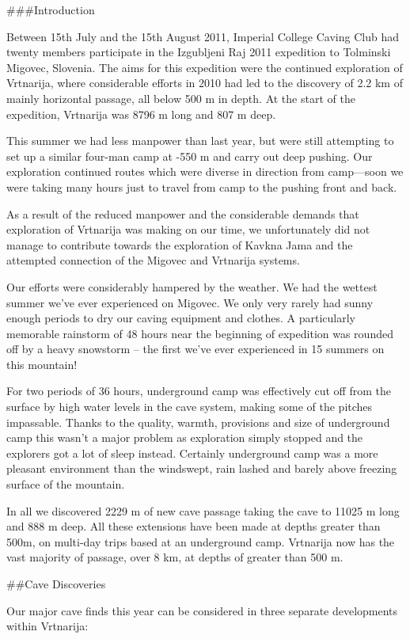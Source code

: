\#\#\#Introduction

Between 15th July and the 15th August 2011, Imperial College Caving Club
had twenty members participate in the Izgubljeni Raj 2011 expedition to
Tolminski Migovec, Slovenia. The aims for this expedition were the
continued exploration of Vrtnarija, where considerable efforts in 2010
had led to the discovery of 2.2 km of mainly horizontal passage, all
below 500 m in depth. At the start of the expedition, Vrtnarija was 8796
m long and 807 m deep.

This summer we had less manpower than last year, but were still
attempting to set up a similar four-man camp at -550 m and carry out
deep pushing. Our exploration continued routes which were diverse in
direction from camp---soon we were taking many hours just to travel from
camp to the pushing front and back.

As a result of the reduced manpower and the considerable demands that
exploration of Vrtnarija was making on our time, we unfortunately did
not manage to contribute towards the exploration of Kavkna Jama and the
attempted connection of the Migovec and Vrtnarija systems.

Our efforts were considerably hampered by the weather. We had the
wettest summer we've ever experienced on Migovec. We only very rarely
had sunny enough periods to dry our caving equipment and clothes. A
particularly memorable rainstorm of 48 hours near the beginning of
expedition was rounded off by a heavy snowstorm -- the first we've ever
experienced in 15 summers on this mountain!

For two periods of 36 hours, underground camp was effectively cut off
from the surface by high water levels in the cave system, making some of
the pitches impassable. Thanks to the quality, warmth, provisions and
size of underground camp this wasn't a major problem as exploration
simply stopped and the explorers got a lot of sleep instead. Certainly
underground camp was a more pleasant environment than the windswept,
rain lashed and barely above freezing surface of the mountain.

In all we discovered 2229 m of new cave passage taking the cave to 11025
m long and 888 m deep. All these extensions have been made at depths
greater than 500m, on multi-day trips based at an underground camp.
Vrtnarija now has the vast majority of passage, over 8 km, at depths of
greater than 500 m.

\#\#Cave Discoveries

Our major cave finds this year can be considered in three separate
developments within Vrtnarija:


